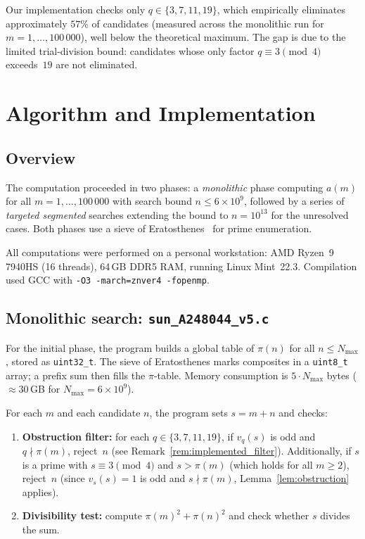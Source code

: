 \documentclass[11pt]{article}
\theoremstyle{definition}
\theoremstyle{remark}
\numberwithin{equation}{section}
\newcommand{\vq}[1]{v_{#1}}
\begin{document}
Our implementation checks only $q \in \{3, 7, 11, 19\}$,
which empirically eliminates approximately $57\%$ of candidates
(measured across the monolithic run for $m = 1, \ldots, 100\,000$),
well below the theoretical maximum.  The gap is due to the
limited trial-division bound: candidates whose only factor
$q \equiv 3 \pmod{4}$ exceeds~$19$ are not eliminated.

\section{Algorithm and Implementation}
\label{sec:algorithm}

\subsection{Overview}

The computation proceeded in two phases:
a \emph{monolithic} phase computing $a(m)$ for all
$m = 1, \ldots, 100\,000$ with search bound $n \le 6 \times 10^9$,
followed by a series of \emph{targeted segmented} searches
extending the bound to $n = 10^{13}$ for the unresolved cases.
Both phases use a sieve of Eratosthenes~\cite{CrandallPomerance}
for prime enumeration.

All computations were performed on a personal workstation:
AMD Ryzen~9 7940HS (16 threads), 64\,GB DDR5 RAM,
running Linux Mint~22.3.  Compilation used GCC with
\texttt{-O3 -march=znver4 -fopenmp}.

\subsection[Monolithic search: sun-A248044-v5.c]{Monolithic search: \texttt{sun\_A248044\_v5.c}}

For the initial phase, the program builds a global table of
$\pi(n)$ for all $n \le N_{\max}$, stored as \texttt{uint32\_t}.
The sieve of Eratosthenes marks composites in a
\texttt{uint8\_t} array; a prefix sum then fills the $\pi$-table.
Memory consumption is $5 \cdot N_{\max}$ bytes
($\approx 30$\,GB for $N_{\max} = 6 \times 10^9$).

For each $m$ and each candidate $n$, the program sets
$s = m + n$ and checks:
\begin{enumerate}
\item \textbf{Obstruction filter:}
  for each $q \in \{3, 7, 11, 19\}$, if $\vq{q}(s)$ is odd
  and $q \nmid \pi(m)$, reject~$n$
  (see Remark~\ref{rem:implemented_filter}).
  Additionally, if $s$ is a prime with $s \equiv 3 \pmod{4}$
  and $s > \pi(m)$ (which holds for all $m \ge 2$), reject~$n$
  (since $\vq{s}(s) = 1$ is odd and $s \nmid \pi(m)$,
  Lemma~\ref{lem:obstruction} applies).
\item \textbf{Divisibility test:}
  compute $\pi(m)^2 + \pi(n)^2$ and check whether $s$ divides the
  sum.
\end{enumerate}
\end{document}
